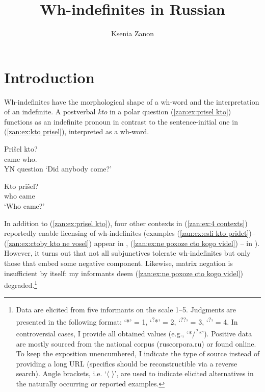 \documentclass[output=paper,colorlinks,citecolor=brown]{langscibook}
\author{Ksenia Zanon\affiliation{University of Cambridge}}
\title{Wh-indefinites in Russian}
\begin{document}
\maketitle

\section{Introduction}\label{zan:sec:intro}
Wh-indefinites have the morphological shape of a wh-word and the interpretation of an indefinite. A postverbal \textit{kto} in a polar question (\ref{zan:ex:prisel kto}) functions as an indefinite pronoun in contrast to the sentence-initial one in (\ref{zan:ex:kto prisel}), interpreted as a wh-word.

\ea 
\ea\label{zan:ex:prisel kto}
\gll Prišel kto?\\
came who.{\INDF} \\\hfill YN question
\glt `Did anybody come?' 

\ex\label{zan:ex:kto prisel}
\gll Kto prišel? \\
       who came \\
        \glt `Who came?'
\z\z

\noindent In addition to (\ref{zan:ex:prisel kto}), four other contexts in (\ref{zan:ex:4 contexts}) reportedly enable licensing of wh-indefinites (examples (\ref{zan:ex:esli kto pridet})--(\ref{zan:ex:ctoby kto ne vosel}) appear in \citealt{yan2005}, (\ref{zan:ex:ne poxoze cto kogo videl}) -- in \citealt{heng2018}). However, it turns out that not all subjunctives tolerate wh-indefinites but only those that embed some negative component. Likewise, matrix negation is insufficient by itself: my informants deem (\ref{zan:ex:ne poxoze cto kogo videl}) degraded.\footnote{Data are elicited from five informants on the scale 1--5. Judgments are presented in the following format: `*' = 1, `\textsuperscript{?}*' = 2, `\textsuperscript{??}' = 3, `\textsuperscript{?}' = 4. In controversial cases, I provide all obtained values (e.g., `*/\textsuperscript{?}*'). Positive data are mostly sourced from the national corpus (ruscorpora.ru) or found online. To keep the exposition unencumbered, I indicate the type of source instead of providing a long URL (specifics should be reconstructible via a reverse search). Angle brackets, i.e. `$\langle$ $\rangle$', are used to indicate elicited alternatives in the naturally occurring or reported examples.}
\end{document}
